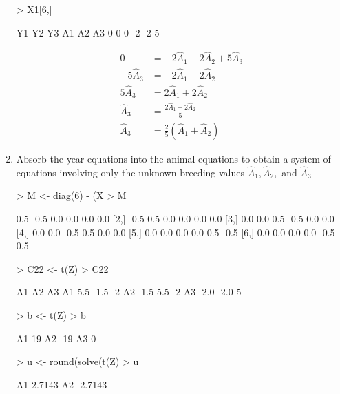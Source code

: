 \documentclass[12pt,a4paper]{paper}
\begin{document}
\begin{enumerate}
\begin{Schunk}
\begin{Sinput}
> X1[6,]
\end{Sinput}
\begin{Soutput}
Y1 Y2 Y3 A1 A2 A3 
 0  0  0 -2 -2  5 
\end{Soutput}
\end{Schunk}
\begin{equation*}
\begin{split}
0 &= -2\hat{A}_1 -2\hat{A}_2 + 5\hat{A}_3 \\
-5\hat{A}_3 &= -2\hat{A}_1 - 2\hat{A}_2 \\
5\hat{A}_3 &= 2\hat{A}_1 + 2\hat{A}_2 \\
\hat{A}_3 &= \frac{2\hat{A}_1 + 2\hat{A}_2 }{5}\\
\hat{A}_3 &= \frac{2}{5}(\hat{A}_1 + \hat{A}_2)
\end{split}
\end{equation*}
\item Absorb the year equations into the animal equations to obtain a system of equations involving only the unknown breeding values $\hat{A}_{1}, \hat{A}_{2},$ and $\hat{A}_{3}$
\begin{Schunk}
\begin{Sinput}
> M <- diag(6) - (X %*% solve(t(X) %*% X) %*% t(X))
> M
\end{Sinput}
\begin{Soutput}
     [,1] [,2] [,3] [,4] [,5] [,6]
[1,]  0.5 -0.5  0.0  0.0  0.0  0.0
[2,] -0.5  0.5  0.0  0.0  0.0  0.0
[3,]  0.0  0.0  0.5 -0.5  0.0  0.0
[4,]  0.0  0.0 -0.5  0.5  0.0  0.0
[5,]  0.0  0.0  0.0  0.0  0.5 -0.5
[6,]  0.0  0.0  0.0  0.0 -0.5  0.5
\end{Soutput}
\begin{Sinput}
> C22 <- t(Z) %*% M %*% Z + (Ainv * lambda)
> C22
\end{Sinput}
\begin{Soutput}
     A1   A2 A3
A1  5.5 -1.5 -2
A2 -1.5  5.5 -2
A3 -2.0 -2.0  5
\end{Soutput}
\begin{Sinput}
> b <- t(Z) %*% M %*% y
> b
\end{Sinput}
\begin{Soutput}
   [,1]
A1   19
A2  -19
A3    0
\end{Soutput}
\begin{Sinput}
> u <- round(solve(t(Z) %*% M %*% Z + (Ainv * lambda)) %*% t(Z) %*% M %*% y,4)
> u
\end{Sinput}
\begin{Soutput}
      [,1]
A1  2.7143
A2 -2.7143

\end{Soutput}
\end{Schunk}
\end{enumerate}
\end{document}
